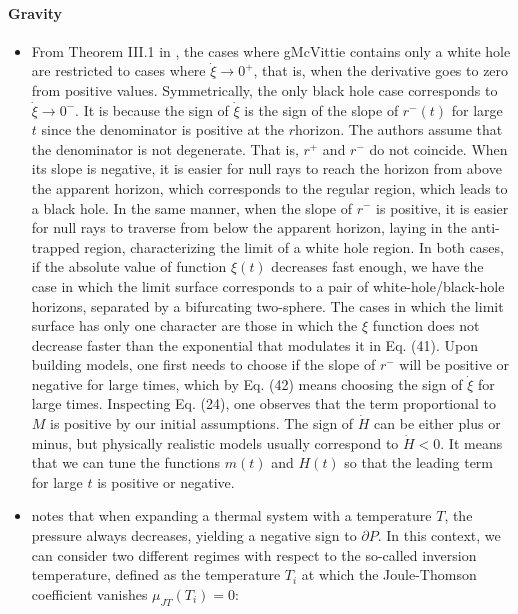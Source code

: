 \documentclass[11pt]{book}
\begin{document}
\paragraph{Gravity}
\begin{itemize}
\item From Theorem III.1 in \cite{maciel2015cosmological},
the cases where gMcVittie contains only a white hole are restricted
to cases where $\dot{\xi}\rightarrow0^{+}$, that is, when the derivative
goes to zero from positive values. Symmetrically, the only black hole
case corresponds to $\dot{\xi}\rightarrow0^{-}$. It is because the
sign of $\dot{\xi}$ is the sign of the slope of $r^{-}\left(t\right)$
for large $t$ since the denominator is positive at the $r$\textminus horizon.
The authors assume that the denominator is not degenerate. That is,
$r^{+}$ and $r^{-}$ do not coincide. When its slope is negative,
it is easier for null rays to reach the horizon from above the apparent
horizon, which corresponds to the regular region, which leads to a
black hole. In the same manner, when the slope of $r^{-}$ is positive,
it is easier for null rays to traverse from below the apparent horizon,
laying in the anti-trapped region, characterizing the limit of a white
hole region. In both cases, if the absolute value of function $\xi\left(t\right)$
decreases fast enough, we have the case in which the limit surface
corresponds to a pair of white-hole/black-hole horizons, separated
by a bifurcating two-sphere. The cases in which the limit surface
has only one character are those in which the $\xi$ function does
not decrease faster than the exponential that modulates it in Eq.
(41). Upon building models, one first needs to choose if the slope
of $r^{-}$ will be positive or negative for large times, which by
Eq. (42) means choosing the sign of $\dot{\xi}$ for large times.
Inspecting Eq. (24), one observes that the term proportional to $M$
is positive by our initial assumptions. The sign of $\dot{H}$ can
be either plus or minus, but physically realistic models usually correspond
to $\dot{H}<0$. It means that we can tune the functions $m\left(t\right)$
and $H\left(t\right)$ so that the leading term for large $t$ is
positive or negative.
\item \cite{chabab2018joule}
notes that when expanding a thermal system with a temperature $T$,
the pressure always decreases, yielding a negative sign to $\partial P$.
In this context, we can consider two different regimes with respect
to the so-called inversion temperature, defined as the temperature
$T_{i}$ at which the Joule-Thomson coefficient vanishes $\mu_{JT}(T_{i})=0$:

\end{itemize}
\end{document}
